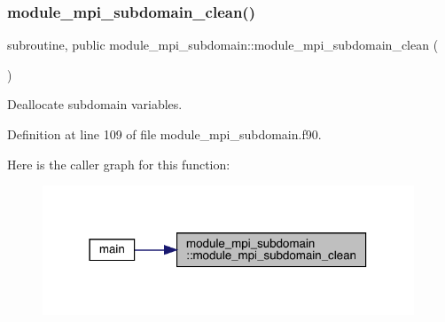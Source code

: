 \subsubsection{\texorpdfstring{module\_mpi\_subdomain\_clean()}{module\_mpi\_subdomain\_clean()}}
{\footnotesize\ttfamily subroutine, public module\+\_\+mpi\+\_\+subdomain\+::module\+\_\+mpi\+\_\+subdomain\+\_\+clean (\begin{DoxyParamCaption}{ }\end{DoxyParamCaption})}



Deallocate subdomain variables. 



Definition at line 109 of file module\+\_\+mpi\+\_\+subdomain.\+f90.

Here is the caller graph for this function\+:\nopagebreak
\begin{figure}[H]
\begin{center}
\leavevmode
\includegraphics[width=314pt]{namespacemodule__mpi__subdomain_ab1a550c72f16254a20785d7f4eae4e1c_icgraph}
\end{center}
\end{figure}
\mbox{\label{namespacemodule__mpi__subdomain_a3e13201bdd812e62d2293bb0e2c2221d}} 
